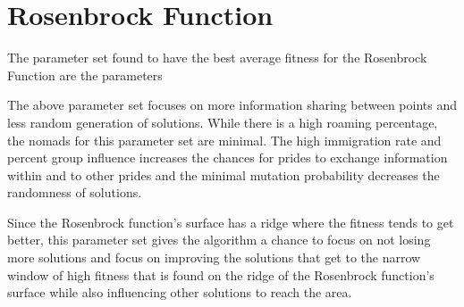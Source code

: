 \section{Rosenbrock Function}

\par The parameter set found to have the best average fitness for the Rosenbrock Function are the parameters


\par The above parameter set focuses on more information sharing between points and less random generation of solutions. While there is a high roaming percentage, the nomads for this parameter set are minimal. The high immigration rate and percent group influence increases the chances for prides to exchange information within and to other prides and the minimal mutation probability decreases the randomness of solutions.

\par Since the Rosenbrock function's surface has a ridge where the fitness tends to get better, this parameter set gives the algorithm a chance to focus on not losing more solutions and focus on improving the solutions that get to the narrow window of high fitness that is found on the ridge of the Rosenbrock function's surface while also influencing other solutions to reach the area.
